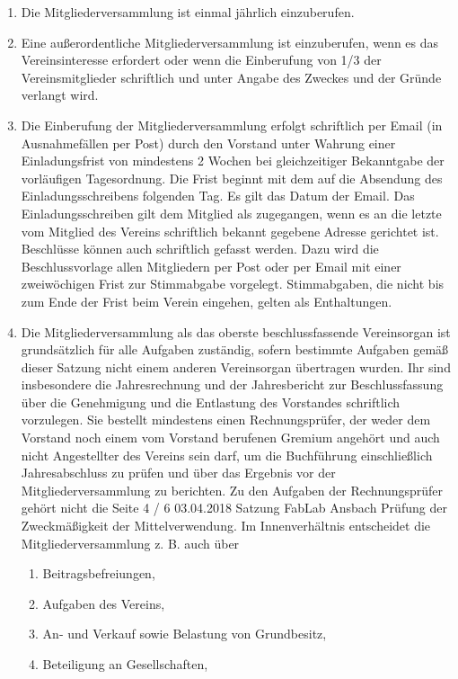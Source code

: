 \begin{enumerate}
  \item Die Mitgliederversammlung ist einmal jährlich einzuberufen.
  \item Eine außerordentliche Mitgliederversammlung ist einzuberufen, wenn es das Vereinsinteresse erfordert oder wenn die Einberufung von 1/3 der Vereinsmitglieder schriftlich und unter Angabe des Zweckes und der Gründe verlangt wird.
  \item Die Einberufung der Mitgliederversammlung erfolgt schriftlich per Email (in Ausnahmefällen per Post) durch den Vorstand unter Wahrung einer Einladungsfrist von mindestens 2 Wochen bei gleichzeitiger Bekanntgabe der vorläufigen Tagesordnung. Die Frist beginnt mit dem auf die Absendung des Einladungsschreibens folgenden Tag. Es gilt das Datum der Email. Das Einladungsschreiben gilt dem Mitglied als zugegangen, wenn es an die letzte vom Mitglied des Vereins schriftlich bekannt gegebene Adresse gerichtet ist. Beschlüsse können auch schriftlich gefasst werden. Dazu wird die Beschlussvorlage allen Mitgliedern per Post oder per Email mit einer zweiwöchigen Frist zur Stimmabgabe vorgelegt. Stimmabgaben, die nicht bis zum Ende der Frist beim Verein eingehen, gelten als Enthaltungen.
  \item Die Mitgliederversammlung als das oberste beschlussfassende Vereinsorgan ist grundsätzlich für alle Aufgaben zuständig, sofern bestimmte Aufgaben gemäß dieser Satzung nicht einem anderen Vereinsorgan übertragen wurden. Ihr sind insbesondere die Jahresrechnung und der Jahresbericht zur Beschlussfassung über die Genehmigung und die Entlastung des Vorstandes schriftlich vorzulegen. Sie bestellt mindestens einen Rechnungsprüfer, der weder dem Vorstand noch einem vom Vorstand berufenen Gremium angehört und auch nicht Angestellter des Vereins sein darf, um die Buchführung einschließlich Jahresabschluss zu prüfen und über das Ergebnis vor der Mitgliederversammlung zu berichten. Zu den Aufgaben der Rechnungsprüfer gehört nicht die Seite 4 / 6 03.04.2018 Satzung FabLab Ansbach Prüfung der Zweckmäßigkeit der Mittelverwendung. Im Innenverhältnis entscheidet die Mitgliederversammlung z. B. auch über
  \begin{enumerate}[label={(\alph*)}]
    \item Beitragsbefreiungen,
    \item Aufgaben des Vereins,
    \item An- und Verkauf sowie Belastung von Grundbesitz,
    \item Beteiligung an Gesellschaften,

\end{enumerate}
\end{enumerate}
